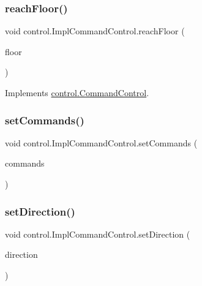 \mbox{\label{classcontrol_1_1_impl_command_control_a5736ac91cdc39805dc27c6af0c9935cb}} 
\subsubsection{\texorpdfstring{reachFloor()}{reachFloor()}}
{\footnotesize\ttfamily void control.\+Impl\+Command\+Control.\+reach\+Floor (\begin{DoxyParamCaption}\item[{int}]{floor }\end{DoxyParamCaption})}



Implements \mbox{\hyperlink{interfacecontrol_1_1_command_control_aed88af210353f0e854d6da8af1089851}{control.\+Command\+Control}}.

\mbox{\label{classcontrol_1_1_impl_command_control_a4a32b15e589ca6ad5be4d6288f73d0d6}} 
\subsubsection{\texorpdfstring{setCommands()}{setCommands()}}
{\footnotesize\ttfamily void control.\+Impl\+Command\+Control.\+set\+Commands (\begin{DoxyParamCaption}\item[{Navigable\+Set$<$ \mbox{\hyperlink{classcontrol_1_1command_1_1_floor_request}{Floor\+Request}} $>$}]{commands }\end{DoxyParamCaption})}

\mbox{\label{classcontrol_1_1_impl_command_control_a122541d8e0d77a6d9ef62a1ee5391ee9}} 
\subsubsection{\texorpdfstring{setDirection()}{setDirection()}}
{\footnotesize\ttfamily void control.\+Impl\+Command\+Control.\+set\+Direction (\begin{DoxyParamCaption}\item[{\mbox{\hyperlink{enumcontrol_1_1command_1_1_direction}{Direction}}}]{direction }\end{DoxyParamCaption})\hspace{0.3cm}{\ttfamily [private]}}

